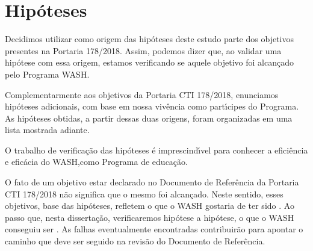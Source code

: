 \documentclass[
12pt,		%
openright,	%
twoside,  %
a4paper,			%
chapter=TITLE,		%
english,			%
french,				%
spanish,			%
brazil				%
]{USPSC-classe/USPSC}
\begin{document}
\section[Hip\'oteses]{Hip\'oteses}\label{Hip\'oteses}
Decidimos utilizar como origem das hip\'oteses deste estudo parte dos objetivos presentes na Portaria 178/2018. Assim, podemos dizer que, ao validar uma hip\'otese com essa origem, estamos verificando se aquele objetivo foi alcan\c{c}ado pelo Programa WASH.

















Complementarmente aos objetivos da Portaria CTI 178/2018, enunciamos hip\'oteses adicionais, com base em nossa viv\^encia como part\'{\i}cipes do Programa. As hip\'oteses obtidas, a partir dessas duas origens, foram organizadas em uma lista mostrada adiante.

















O trabalho de verifica\c{c}\~ao das hip\'oteses \'e imprescind\'{\i}vel para conhecer a efici\^encia e efic\'acia do WASH,como Programa de educa\c{c}\~ao.

















O fato de um objetivo estar declarado no Documento de Refer\^encia da Portaria CTI 178/2018 n\~ao significa que o mesmo foi alcan\c{c}ado. Neste sentido, esses objetivos, base das hip\'oteses, refletem \textquotedbl  o que o WASH gostaria de ter sido \textquotedbl . Ao passo que, nesta disserta\c{c}\~ao, verificaremos hip\'otese a hip\'otese, \textquotedbl  o que o WASH conseguiu ser \textquotedbl . As falhas eventualmente encontradas contribuir\~ao para apontar o caminho que deve ser seguido na revis\~ao do Documento de Refer\^encia.
\end{document}
